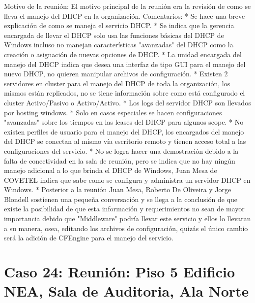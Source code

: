 \begin{description}
\begin{enumerate}
Motivo de la reunión: El motivo principal de la reunión era la revisión de como
se lleva el manejo del DHCP en la organización. Comentarios: * Se hace una
breve explicación de como se maneja el servicio DHCP. * Se indica que la
gerencia encargada de llevar el DHCP solo usa las funciones básicas del DHCP de
Windows incluso no manejan características "avanzadas" del DHCP como la
creación o asignación de nuevas opciones de DHCP. * La unidad encargada del
manejo del DHCP indica que desea una interfaz de tipo GUI para el manejo del
nuevo DHCP, no quieren manipular archivos de configuración. * Existen 2
servidores en cluster para el manejo del DHCP de toda la organización, los
mismos están replicados, no se tiene información sobre como está configurado el
cluster Activo/Pasivo o Activo/Activo. * Los logs del servidor DHCP son
llevados por hosting windows. * Solo en casos especiales se hacen
configuraciones "avanzadas" sobre los tiempos en las leases del DHCP para
algunos scope. * No existen perfiles de usuario para el manejo del DHCP, los
encargados del manejo del DHCP se conectan al mismo vía escritorio remoto y
tienen acceso total a las configuraciones del servicio. * No se logra hacer una
demostración debido a la falta de conectividad en la sala de reunión, pero se
indica que no hay ningún manejo adicional a lo que brinda el DHCP de Windows,
Juan Mesa de COVETEL indica que sabe como se configura y administra un servidor
DHCP en Windows. * Posterior a la reunión Juan Mesa, Roberto De Oliveira y
Jorge Blondell sostienen una pequeña conversación y se llega a la conclusión de
que existe la posibilidad de que esta información y requerimientos no sean de
mayor importancia debido que "Middleware" podría llevar este servicio y ellos
lo llevaran a su manera, osea, editando los archivos de configuración, quizás
el único cambio será la adición de CFEngine para el manejo del servicio.    \end{enumerate}

\end{description}

\section{Caso 24: Reunión: Piso 5 Edificio NEA, Sala de Auditoria, Ala Norte }

